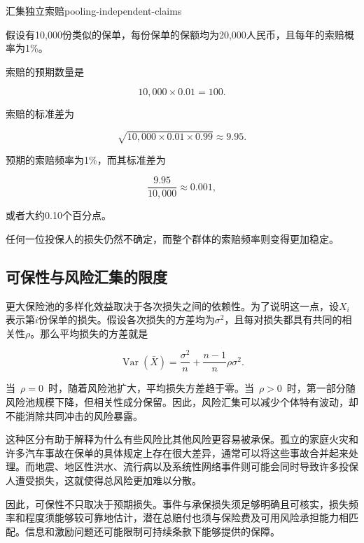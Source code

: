 \begin{example}{汇集独立索赔}{pooling-independent-claims}

假设有10,000份类似的保单，每份保单的保额均为20,000人民币，且每年的索赔概率为1\%。

索赔的预期数量是

$$
10{,}000\times 0.01=100.
$$

索赔的标准差为

$$
\sqrt{10{,}000\times 0.01\times 0.99}
\approx 9.95.
$$

预期的索赔频率为1\%，而其标准差为

$$
\frac{9.95}{10{,}000}
\approx 0.001,
$$

或者大约0.10个百分点。

任何一位投保人的损失仍然不确定，而整个群体的索赔频率则变得更加稳定。

\end{example}


\subsection{可保性与风险汇集的限度}

更大保险池的多样化效益取决于各次损失之间的依赖性。为了说明这一点，设$X_i$表示第$i$份保单的损失。假设各次损失的方差均为$\sigma^2$，且每对损失都具有共同的相关性$\rho$。那么平均损失的方差就是

\begin{equation}
\operatorname{Var}(\bar{X})=
\frac{\sigma^2}{n}
+
\frac{n-1}{n}\rho\sigma^2.
\label{eq:ch15-correlated-pooling}
\end{equation}

当~$\rho=0$~时，随着风险池扩大，平均损失方差趋于零。当~$\rho>0$~时，第一部分随风险池规模下降，但相关性成分保留。因此，风险汇集可以减少个体特有波动，却不能消除共同冲击的风险暴露。

这种区分有助于解释为什么有些风险比其他风险更容易被承保。孤立的家庭火灾和许多汽车事故在保单的具体规定上存在很大差异，通常可以将这些事故合并起来处理。而地震、地区性洪水、流行病以及系统性网络事件则可能会同时导致许多投保人遭受损失，这就使得总风险更加难以分散。

因此，可保性不只取决于预期损失。事件与承保损失须足够明确且可核实，损失频率和程度须能够较可靠地估计，潜在总赔付也须与保险费及可用风险承担能力相匹配。信息和激励问题还可能限制可持续条款下能够提供的保障。

